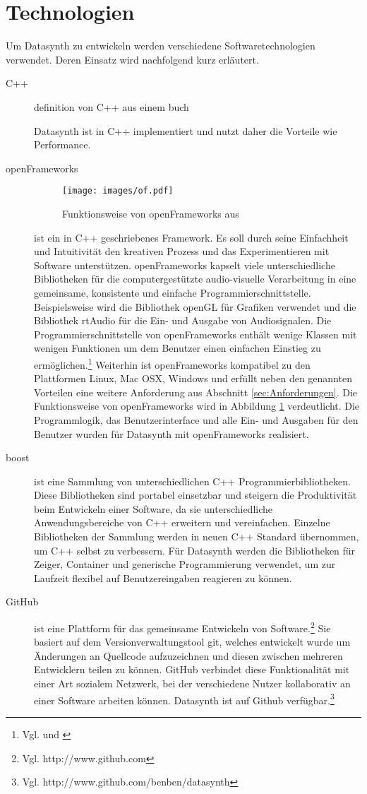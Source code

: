 \documentclass[a4paper, 12pt, DIVcalc, onepage, pdftex, headsepline, footsepline]{scrreprt}
\begin{document}
\section{Technologien}
\label{sec:Technologien}
Um Datasynth zu entwickeln werden verschiedene Softwaretechnologien verwendet.
Deren Einsatz wird nachfolgend kurz erläutert.
\begin{description}
\item[C++]

definition von C++ aus einem buch

Datasynth ist in C++ implementiert und nutzt daher die Vorteile
wie Performance.

\item[openFrameworks]
\begin{figure}
\centering
\texttt{[image: images/of.pdf]}
\caption{Funktionsweise von openFrameworks aus \citep{of_wiki}}
\label{fig:of}
\end{figure}
ist ein in C++ geschriebenes Framework. Es soll durch seine
Einfachheit und Intuitivität den kreativen Prozess und das
Experimentieren mit Software unterstützen. openFrameworks
kapselt viele unterschiedliche Bibliotheken für die
computergestützte audio-visuelle Verarbeitung in eine gemeinsame,
konsistente und einfache Programmierschnittstelle. Beispielsweise
wird die Bibliothek openGL für Grafiken verwendet und die
Bibliothek rtAudio für die Ein- und Ausgabe von Audiosignalen.
Die Programmierschnittstelle von openFrameworks enthält
wenige Klassen mit wenigen Funktionen um dem Benutzer einen
einfachen Einstieg zu ermöglichen.\footnote{Vgl. \citep{of1} und \citep{of2}}
Weiterhin ist openFrameworks kompatibel zu den Plattformen
Linux, Mac OSX, Windows und erfüllt neben den genannten Vorteilen
eine weitere Anforderung aus Abschnitt \ref{sec:Anforderungen}.
Die Funktionsweise von openFrameworks wird in Abbildung
\ref{fig:of} verdeutlicht. 
Die Programmlogik, das Benutzerinterface und alle Ein- und
Ausgaben für den Benutzer wurden für Datasynth mit openFrameworks
realisiert.
\item[boost]
ist eine Sammlung von unterschiedlichen C++ Programmierbibliotheken.
Diese Bibliotheken sind portabel einsetzbar und steigern die
Produktivität beim Entwickeln einer Software, da sie unterschiedliche
Anwendungsbereiche von C++ erweitern und vereinfachen.
Einzelne Bibliotheken der Sammlung werden in neuen C++ Standard
übernommen, um C++ selbst zu verbessern.
Für Datasynth werden die Bibliotheken für Zeiger, Container
und generische Programmierung verwendet, um zur Laufzeit flexibel
auf Benutzereingaben reagieren zu können.
\item[GitHub]
ist eine Plattform für das gemeinsame Entwickeln von Software.\footnote{Vgl. http://www.github.com}
Sie basiert auf dem Versionverwaltungstool git, welches entwickelt wurde
um Änderungen an Quellcode aufzuzeichnen und diesen zwischen mehreren
Entwicklern teilen zu können. GitHub verbindet diese Funktionalität mit
einer Art sozialem Netzwerk, bei der verschiedene Nutzer kollaborativ
an einer Software arbeiten können. Datasynth ist auf Github verfügbar.\footnote{Vgl. http://www.github.com/benben/datasynth}
\end{description}
\end{document}
